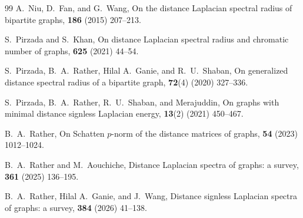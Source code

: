 \documentclass[12pt]{article}
\theoremstyle{plain}
\theoremstyle{definition}
\begin{document}
\begin{thebibliography}{99}
A.~Niu, D.~Fan, and G.~Wang,
\newblock On the distance Laplacian spectral radius of bipartite graphs,
 \textbf{186} (2015) 207--213.

S.~Pirzada and S.~Khan,
\newblock On distance Laplacian spectral radius and chromatic number of graphs,
 \textbf{625} (2021) 44--54.

S.~Pirzada, B.~A.~Rather, Hilal A.~Ganie, and R.~U.~Shaban,
\newblock On generalized distance spectral radius of a bipartite graph,
 \textbf{72}(4) (2020) 327--336.

S.~Pirzada, B.~A.~Rather, R.~U.~Shaban, and Merajuddin,
\newblock On graphs with minimal distance signless Laplacian energy,
 \textbf{13}(2) (2021) 450--467.

B.~A.~Rather,
\newblock On Schatten $p$-norm of the distance matrices of graphs,
 \textbf{54} (2023) 1012--1024.

B.~A.~Rather and M.~Aouchiche,
\newblock Distance Laplacian spectra of graphs: a survey,
 \textbf{361} (2025) 136--195.

B.~A.~Rather, Hilal A.~Ganie, and J.~Wang,
\newblock Distance signless Laplacian spectra of graphs: a survey,
 \textbf{384} (2026) 41--138.

\end{thebibliography}
\end{document}
